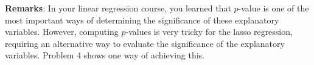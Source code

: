 \documentclass[12pt]{article}
\begin{document}
\begin{enumerate}
\textbf{Remarks}: In your linear regression course, you learned that $p$-value is one of the most important ways of determining the significance of these explanatory variables. However, computing $p$-values is very tricky for the lasso regression, requiring an alternative way to evaluate the significance of the explanatory variables. Problem 4 shows one way of achieving this.

\end{enumerate}
\end{document}
